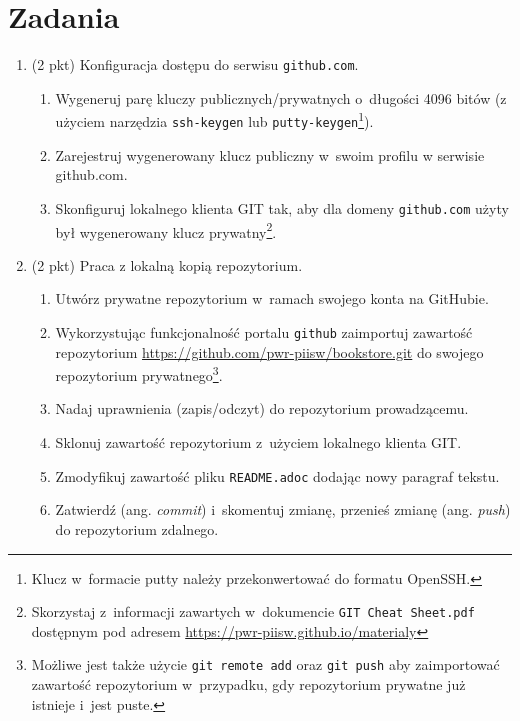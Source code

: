 \documentclass[12pt]{article}
\begin{document}
    \section*{Zadania}
    \begin{enumerate}
        \item\label{exc:github-access}
            (2 pkt) Konfiguracja dostępu do serwisu \texttt{github.com}.
            \begin{enumerate}
                \item Wygeneruj parę kluczy publicznych/prywatnych o~długości 4096 bitów (z użyciem narzędzia \texttt{ssh-keygen} lub \texttt{putty-keygen}\footnote{Klucz w~formacie putty należy przekonwertować do formatu OpenSSH.}).
                \item Zarejestruj wygenerowany klucz publiczny w~swoim profilu w serwisie github.com.
                \item Skonfiguruj lokalnego klienta GIT tak, aby dla domeny \texttt{github.com} użyty był wygenerowany klucz prywatny\footnote{Skorzystaj z~informacji zawartych w~dokumencie \texttt{GIT Cheat Sheet.pdf} dostępnym pod adresem \url{https://pwr-piisw.github.io/materialy}}.
            \end{enumerate}

        \item\label{exc:git-repo}
            (2 pkt) Praca z lokalną kopią repozytorium.
            \begin{enumerate}
                \item Utwórz prywatne repozytorium w~ramach swojego konta na GitHubie.
                \item Wykorzystując funkcjonalność portalu \texttt{github} zaimportuj zawartość repozytorium \url{https://github.com/pwr-piisw/bookstore.git} do swojego repozytorium prywatnego\footnote{Możliwe jest także użycie \texttt{git remote add} oraz \texttt{git push} aby zaimportować zawartość repozytorium w~przypadku, gdy repozytorium prywatne już istnieje i~jest puste.}.
                \item Nadaj uprawnienia (zapis/odczyt) do repozytorium prowadzącemu.
                \item Sklonuj zawartość repozytorium z~użyciem lokalnego klienta GIT.
                \item Zmodyfikuj zawartość pliku \texttt{README.adoc} dodając nowy paragraf tekstu.
                \item Zatwierdź (ang. \textit{commit}) i~skomentuj zmianę, przenieś zmianę (ang. \textit{push}) do repozytorium zdalnego.
            \end{enumerate}


\end{enumerate}
\end{document}
